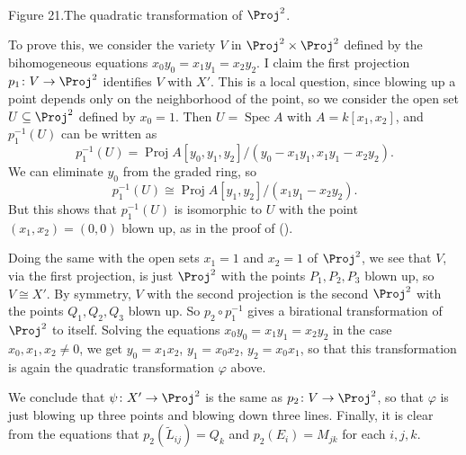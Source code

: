 {\begin{center}
\\[3pt]
\small\hypertarget{fig-book-21}{}Figure 21.\quad The quadratic transformation of $\Proj^2$.
\end{center}

To prove this, we consider the variety $V$ in $\Proj^2\times\Proj^2$ defined by the bihomogeneous equations $x_0y_0=x_1y_1=x_2y_2$. I claim the first projection $p_1\colon V\to\Proj^2$ identifies $V$ with $X'$. This is a local question, since blowing up a point depends only on the neighborhood of the point, so we consider the open set $U\subseteq\Proj^2$ defined by $x_0=1$. Then $U=\operatorname{Spec}A$ with $A=k[x_1,x_2]$, and $p_1^{-1}(U)$ can be written as
\[
p_1^{-1}(U)=\operatorname{Proj} A[y_0,y_1,y_2]/(y_0-x_1y_1,x_1y_1-x_2y_2).
\]
\noindent We can eliminate $y_0$ from the graded ring, so
\[
p_1^{-1}(U)\cong\operatorname{Proj} A[y_1,y_2]/(x_1y_1-x_2y_2).
\]
\noindent But this shows that $p_1^{-1}(U)$ is isomorphic to $U$ with the point $(x_1,x_2)=(0,0)$ blown up, as in the proof of ().

Doing the same with the open sets $x_1=1$ and $x_2=1$ of $\Proj^2$, we see that $V$, via the first projection, is just $\Proj^2$ with the points $P_1,P_2,P_3$ blown up, so $V\cong X'$. By symmetry, $V$ with the second projection is the second $\Proj^2$ with the points $Q_1,Q_2,Q_3$ blown up. So $p_2\circ p_1^{-1}$ gives a birational transformation of $\Proj^2$ to itself. Solving the equations $x_0y_0=x_1y_1=x_2y_2$ in the case $x_0,x_1,x_2\ne0$, we get $y_0=x_1x_2$, $y_1=x_0x_2$, $y_2=x_0x_1$, so that this transformation is again the quadratic transformation $\varphi$ above.

We conclude that $\psi\colon X'\to\Proj^2$ is the same as $p_2\colon V\to\Proj^2$, so that $\varphi$ is just blowing up three points and blowing down three lines. Finally, it is clear from the equations that $p_2(\widetilde L_{ij})=Q_k$ and $p_2(E_i)=M_{jk}$ for each $i,j,k$.
}
